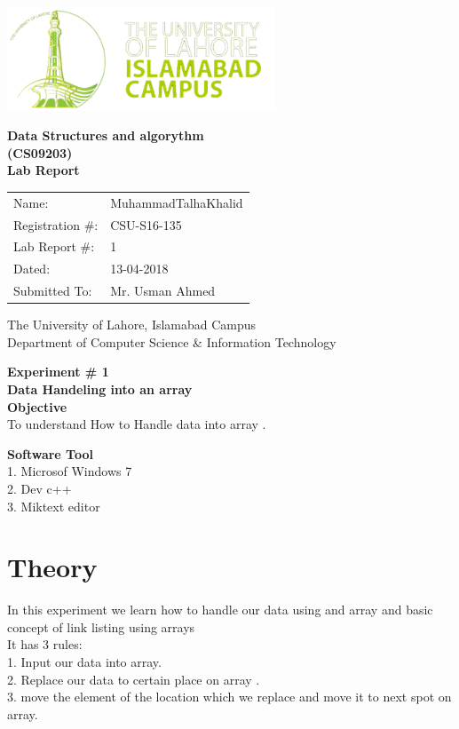 \documentclass[11pt]{article}            %
\begin{document}
\begin{titlepage}
    \centering
  \vfill
    \includegraphics[width=8cm]{uni_logo.png} \\ 
	\vskip2cm
    {\bfseries\Large
	Data Structures and algorythm  \\ (CS09203)\\
	
	\vskip2cm
	Lab Report 
	 
	\vskip2cm
	}    

\begin{center}
\begin{tabular}{ l l  } 

Name: & MuhammadTalhaKhalid \\ 
Registration \#: &CSU-S16-135\\ 
Lab Report \#: & 1 \\ 
 Dated:& 13-04-2018\\ 
Submitted To:& Mr. Usman Ahmed\\ 

\end{tabular}
\end{center}
    \vfill
    The University of Lahore, Islamabad Campus\\
Department of Computer Science \& Information Technology
\end{titlepage}


    
    {\bfseries\Large
\centering
	Experiment \# 1 \\

Data Handeling into an array\\
	
	}    
 \vskip1cm
 \textbf {Objective}\\  To understand How to Handle data into array .
 
 \textbf {Software Tool} \\
1. Microsof Windows 7 \\
2. Dev c++\\
3. Miktext editor \\

\section{Theory }              
In this experiment we learn how to handle our data using and array and basic concept of link listing using arrays \\
It has 3 rules:\\
1.	Input our data into array.\\
2.	Replace our data to certain place on array .\\ 
3.	move the element of the location which we replace and move it to next spot on array.\\ \\ 
\end{document}
